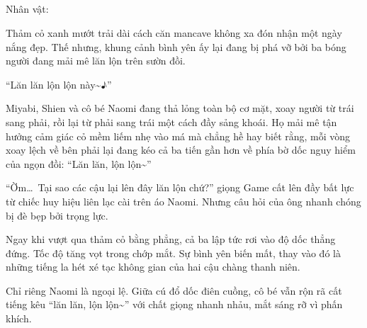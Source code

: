 \documentclass[../main.tex]{subfiles}
\begin{document}
\vspace{120pt}


\vspace{-30pt}

\subsection*{\label{ep-SM1.I}}
\vspace{-4pt}
\begin{center}
  {\caviar\fontsize{12pt}{12pt}\selectfont Nhân vật:       }
\end{center}

Thảm cỏ xanh mướt trải dài cách căn mancave không xa đón nhận một ngày nắng đẹp. Thế nhưng, khung cảnh bình yên ấy lại đang bị phá vỡ bởi ba bóng người đang mải mê lăn lộn trên sườn đồi.


``Lăn lăn lộn lộn này\~{}♪''

Miyabi, Shien và cô bé Naomi đang thả lỏng toàn bộ cơ mặt, xoay người từ trái sang phải, rồi lại từ phải sang trái một cách đầy sảng khoái. Họ mải mê tận hưởng cảm giác cỏ mềm liếm nhẹ vào má mà chẳng hề hay biết rằng, mỗi vòng xoay lệch về bên phải lại đang kéo cả ba tiến gần hơn về phía bờ dốc nguy hiểm của ngọn đồi: ``Lăn lăn, lộn lộn\~{}''

``Ờm\dots\ Tại sao các cậu lại lên đây lăn lộn chứ?'' giọng Game cất lên đầy bất lực từ chiếc huy hiệu liên lạc cài trên áo Naomi. Nhưng câu hỏi của ông nhanh chóng bị đè bẹp bởi trọng lực.

Ngay khi vượt qua thảm cỏ bằng phẳng, cả ba lập tức rơi vào độ dốc thẳng đứng. Tốc độ tăng vọt trong chớp mắt. Sự bình yên biến mất, thay vào đó là những tiếng la hét xé tạc không gian của hai cậu chàng thanh niên.

Chỉ riêng Naomi  là ngoại lệ. Giữa cú đổ dốc điên cuồng, cô bé vẫn rộn rã cất tiếng kêu ``lăn lăn, lộn lộn\~{}'' với chất giọng nhanh nhảu, mắt sáng rỡ vì phấn khích.
\end{document}
